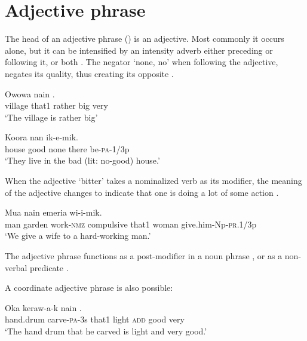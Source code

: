 \section{Adjective phrase} \label{sec:4.2}
{}
The head of an adjective phrase () is an adjective. Most commonly it occurs alone, but it can be intensified by an intensity adverb either preceding or following it, or both .  The negator  `none, no' when following the adjective, negates its quality, thus creating its opposite .  

\ea%
\label{ex:4:x841}
\gll Owowa  nain    . \\
    village  that1  rather  big  very  \\
\glt`The village is rather big'
\z

\ea%
\label{ex:4:x842}
\gll Koora     nan  ik-e-mik. \\
   house  good  none  there  be-\textsc{pa}-1/3p   \\
\glt`They live in the bad (lit: no-good) house.'
\z

When the adjective   `bitter' takes a nominalized verb as its modifier, the meaning of the adjective changes to indicate that one is doing a lot of some action .

\ea%
\label{ex:4:x840}
\gll Mua       nain  emeria wi-i-mik. \\
   man  garden  work-\textsc{nmz}  compulsive  that1  woman  give.him-Np-\textsc{pr}.1/3p   \\
\glt`We give a wife to a hard-working man.'
\z

The adjective phrase functions as a post-modifier in a noun phrase , or as a non-verbal predicate . 

A coordinate adjective phrase is also possible:

\ea%
\label{ex:4:x891}
\gll Oka  keraw-a-k  nain     . \\
    hand.drum  carve-\textsc{pa}-3s  that1  light  \textsc{add}  good  very  \\
\glt`The hand drum that he carved is light and very good.'
\z

